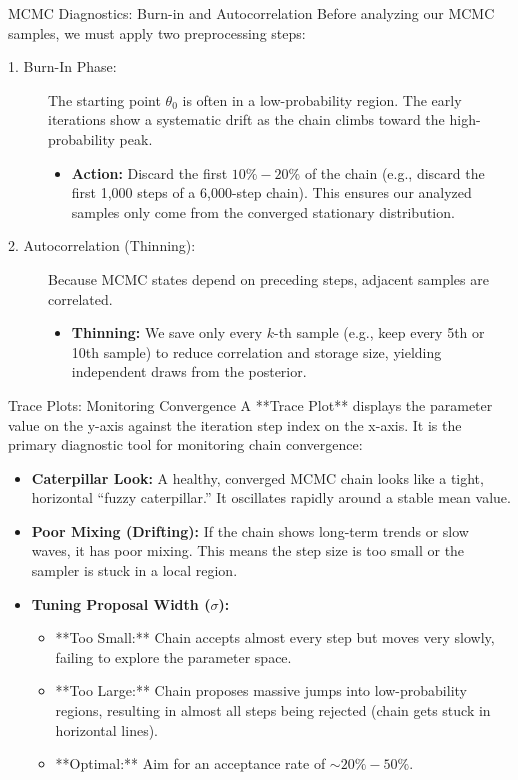 \documentclass[9pt]{beamer}
\begin{document}
\begin{frame}{MCMC Diagnostics: Burn-in and Autocorrelation}
  Before analyzing our MCMC samples, we must apply two preprocessing steps:
  \begin{description}
    \item[1. Burn-In Phase:]
      The starting point $\theta_0$ is often in a low-probability region. The early iterations show a systematic drift as the chain climbs toward the high-probability peak.
      \begin{itemize}
        \item \textbf{Action:} Discard the first $10\% - 20\%$ of the chain (e.g., discard the first 1,000 steps of a 6,000-step chain). This ensures our analyzed samples only come from the converged stationary distribution.
      \end{itemize}
    \item[2. Autocorrelation (Thinning):]
      Because MCMC states depend on preceding steps, adjacent samples are correlated.
      \begin{itemize}
        \item \textbf{Thinning:} We save only every $k$-th sample (e.g., keep every 5th or 10th sample) to reduce correlation and storage size, yielding independent draws from the posterior.
      \end{itemize}
  \end{description}
\end{frame}

\begin{frame}{Trace Plots: Monitoring Convergence}
  A **Trace Plot** displays the parameter value on the y-axis against the iteration step index on the x-axis. It is the primary diagnostic tool for monitoring chain convergence:
  \begin{itemize}
    \item \textbf{Caterpillar Look:} A healthy, converged MCMC chain looks like a tight, horizontal ``fuzzy caterpillar.'' It oscillates rapidly around a stable mean value.
    \item \textbf{Poor Mixing (Drifting):} If the chain shows long-term trends or slow waves, it has poor mixing. This means the step size is too small or the sampler is stuck in a local region.
    \item \textbf{Tuning Proposal Width ($\sigma$):}
      \begin{itemize}
        \item **Too Small:** Chain accepts almost every step but moves very slowly, failing to explore the parameter space.
        \item **Too Large:** Chain proposes massive jumps into low-probability regions, resulting in almost all steps being rejected (chain gets stuck in horizontal lines).
        \item **Optimal:** Aim for an acceptance rate of $\sim 20\% - 50\%$.
      \end{itemize}
  \end{itemize}
\end{frame}
\end{document}
